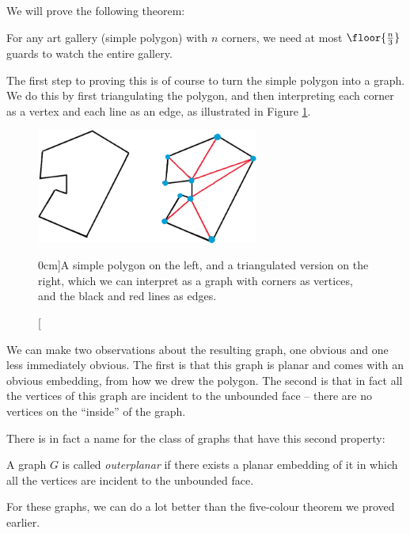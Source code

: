 \documentclass[nobib]{tufte-handout}
\begin{document}
We will prove the following theorem:

\begin{theorem}
  For any art gallery (simple polygon) with $n$ corners, we need at most $\floor{\frac{n}{3}}$ guards to watch the entire gallery.
\end{theorem}

The first step to proving this is of course to turn the simple polygon into a graph. We do this by first triangulating the polygon, and then interpreting each corner as a vertex and each line as an edge, as illustrated in Figure \ref{fig:triangulated_polygon}.

\begin{figure}
  \centering
  \includegraphics[width=0.65\textwidth]{graphics/L12_colouring/triangulated_polygon.png}
  \caption[][0cm]{A simple polygon on the left, and a triangulated version on the right, which we can interpret as a graph with corners as vertices, and the black and red lines as edges.}
  \label{fig:triangulated_polygon}
\end{figure}

We can make two observations about the resulting graph, one obvious and one less immediately obvious. The first is that this graph is planar and comes with an obvious embedding, from how we drew the polygon. The second is that in fact all the vertices of this graph are incident to the unbounded face -- there are no vertices on the ``inside'' of the graph.

There is in fact a name for the class of graphs that have this second property:

\begin{definition}
  A graph $G$ is called \emph{outerplanar} if there exists a planar embedding of it in which all the vertices are incident to the unbounded face.
\end{definition}

For these graphs, we can do a lot better than the five-colour theorem we proved earlier.
\end{document}
